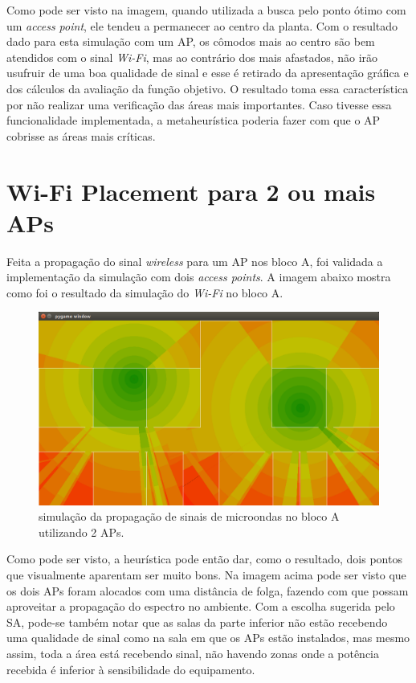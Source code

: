 \documentclass[
	12pt,				%
	openright,			%
	twoside,			%
	a4paper,			%
	english,			%
	french,				%
	spanish,			%
	brazil				%
	]{abntex2}
\begin{document}
Como pode ser visto na imagem, quando utilizada a busca pelo ponto ótimo com um \textit{access point}, ele tendeu a permanecer ao centro da planta. Com o resultado dado para esta simulação com um AP, os cômodos mais ao centro são bem atendidos com o sinal \textit{Wi-Fi}, mas ao contrário dos mais afastados, não irão usufruir de uma boa qualidade de sinal e esse é retirado da apresentação gráfica e dos cálculos da avaliação da função objetivo. O resultado toma essa característica por não realizar uma verificação das áreas mais importantes. Caso tivesse essa funcionalidade implementada, a metaheurística poderia fazer com que o AP cobrisse as áreas mais críticas.

\section[Wi-Fi Placement para 2 ou mais APs]{Wi-Fi Placement para 2 ou mais APs}

Feita a propagação do sinal \textit{wireless} para um AP nos bloco A, foi validada a implementação da simulação com dois \textit{access points}. A imagem abaixo mostra como foi o resultado da simulação do \textit{Wi-Fi} no bloco A.

\begin{figure}[ht]
	\caption{\label{captura-dois-aps}simulação da propagação de sinais de microondas no bloco A utilizando 2 APs.
	}
	\begin{center}
		\includegraphics[scale=0.4]{images/captura-2-aps.jpg}
	\end{center}
\end{figure}

Como pode ser visto, a heurística pode então dar, como o resultado, dois pontos que visualmente aparentam ser muito bons. Na imagem acima pode ser visto que os dois APs foram alocados com uma distância de folga, fazendo com que possam aproveitar a propagação do espectro no ambiente. Com a escolha sugerida pelo SA, pode-se também notar que as salas da parte inferior não estão recebendo uma qualidade de sinal como na sala em que os APs estão instalados, mas mesmo assim, toda a área está recebendo sinal, não havendo zonas onde a potência recebida é inferior à sensibilidade do equipamento.
\end{document}
